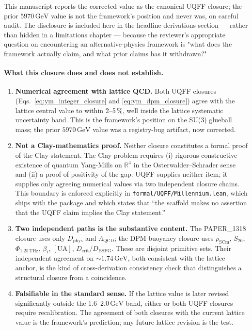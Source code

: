 This manuscript reports the corrected value as the canonical UQFF
closure; the prior $5970\,\mathrm{GeV}$ value is not the framework's
position and never was, on careful audit. The disclosure is
included here in the headline-derivations section --- rather than
hidden in a limitations chapter --- because the reviewer's
appropriate question on encountering an alternative-physics
framework is "what does the framework actually claim, and what
prior claims has it withdrawn?"

\paragraph{What this closure does and does not establish.}

\begin{enumerate}
  \item \textbf{Numerical agreement with lattice QCD.} Both UQFF
        closures (Eqs.~\ref{eq:ym_integer_closure} and
        \ref{eq:ym_dpm_closure}) agree with the lattice
        central value to within 2--5\,\%, well inside the lattice
        systematic uncertainty band. This is the framework's position
        on the SU(3) glueball mass; the prior $5970\,\mathrm{GeV}$
        value was a registry-bug artifact, now corrected.
  \item \textbf{Not a Clay-mathematics proof.} Neither closure
        constitutes a formal proof of the Clay statement. The Clay
        problem requires (i) rigorous constructive existence of
        quantum Yang-Mills on $\mathbb{R}^4$ in the
        Osterwalder--Schrader sense and (ii) a proof of positivity of
        the gap. UQFF supplies neither item; it supplies only
        agreeing numerical values via two independent closure chains.
        This boundary is enforced explicitly in
        \texttt{formal/UQFF/Millennium.lean}, which ships with the
        package and which states that ``the scaffold makes no
        assertion that the UQFF claim implies the Clay statement.''
  \item \textbf{Two independent paths is the substantive content.}
        The PAPER\_1318 closure uses only $D_{\text{phys}}$ and
        $\Lambda_{\text{QCD}}$; the DPM-buoyancy closure uses
        $\rho_{\text{SCm}}$, $S_{26}$, $\Phi_{1.25\,\text{THz}}$,
        $\beta_i$, $[\mathrm{UA}]$, $D_{\text{crit}}/D_{\text{BSFG}}$.
        These are disjoint primitive sets. Their independent
        agreement on $\sim 1.74\,\mathrm{GeV}$, both consistent with
        the lattice anchor, is the kind of cross-derivation
        consistency check that distinguishes a structural closure
        from a coincidence.
  \item \textbf{Falsifiable in the standard sense.} If the lattice
        value is later revised significantly outside the
        $1.6$--$2.0\,\mathrm{GeV}$ band, either or both UQFF closures
        require recalibration. The agreement of both closures with
        the current lattice value is the framework's prediction; any
        future lattice revision is the test.
\end{enumerate}

